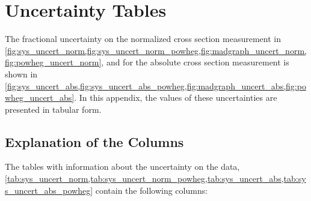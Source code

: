 \chapter{Uncertainty Tables}
\label{app:uncertainty_tables}

The fractional uncertainty on the normalized cross section measurement in
\cref{fig:sys_uncert_norm,fig:sys_uncert_norm_powheg,fig:madgraph_uncert_norm,fig:powheg_uncert_norm},
and for the absolute cross section measurement is shown in
\cref{fig:sys_uncert_abs,fig:sys_uncert_abs_powheg,fig:madgraph_uncert_abs,fig:powheg_uncert_abs}.
In this appendix, the values of these uncertainties are presented in tabular
form.

\section{Explanation of the Columns}

The tables with information about the uncertainty on the data,
\cref{tab:sys_uncert_norm,tab:sys_uncert_norm_powheg,tab:sys_uncert_abs,tab:sys_uncert_abs_powheg}
contain the following columns:

